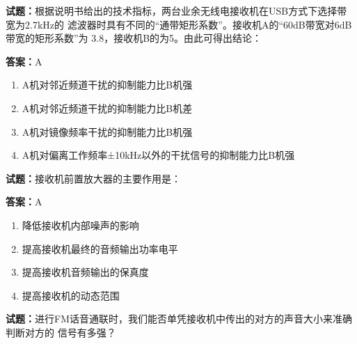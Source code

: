 \documentclass{ctexbook}
\begin{document}




\vspace{1em}

\textbf{试题：}根据说明书给出的技术指标，两台业余无线电接收机在USB方式下选择带宽为2.7kHz的
滤波器时具有不同的“通带矩形系数”。接收机A的“60dB带宽对6dB带宽的矩形系数”为
3.8，接收机B的为5。由此可得出结论： 

\textbf{答案：}A 

\begin{enumerate}[leftmargin=3em]
  \item A机对邻近频道干扰的抑制能力比B机强 

  \item A机对邻近频道干扰的抑制能力比B机差 

  \item A机对镜像频率干扰的抑制能力比B机强 

  \item A机对偏离工作频率±10kHz以外的干扰信号的抑制能力比B机强 

\end{enumerate}





\vspace{1em}

\textbf{试题：}接收机前置放大器的主要作用是： 

\textbf{答案：}A 

\begin{enumerate}[leftmargin=3em]
  \item 降低接收机内部噪声的影响 

  \item 提高接收机最终的音频输出功率电平 

  \item 提高接收机音频输出的保真度 

  \item 提高接收机的动态范围 

\end{enumerate}





\vspace{1em}

\textbf{试题：}进行FM话音通联时，我们能否单凭接收机中传出的对方的声音大小来准确判断对方的
信号有多强？ 
\end{document}

